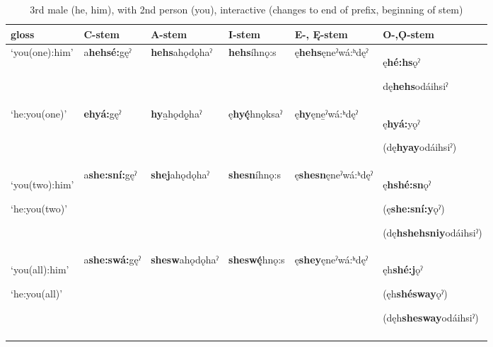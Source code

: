 \begin{table}
\caption{3rd male (he, him), with 2nd person (you), interactive (changes to end of prefix, beginning of stem)}
\label{tab:1:3m2pron2}
\tiny{
\begin{tabularx}{\textwidth}{XXXXXX}
\lsptoprule
gloss & C-stem & A-stem & I-stem & E-, Ę{}-stem & O-,Ǫ{}-stem\\
\midrule
‘you(one):him’ & a\textbf{hehsé:}gęˀ & \textbf{hehs}ahǫdǫhaˀ & \textbf{hehs}íhnǫ:s & ę\textbf{hehs}ęneˀwá:ʰdęˀ & ę\textbf{hé:hs}ǫˀ

dę\textbf{hehs}odáihsiˀ\\
‘he:you(one)’ & \textbf{ehyá:}gęˀ & \textbf{hy}a̱hǫdǫ̱haˀ & ę\textbf{hy\'{ę}}hnǫksaˀ & ę\textbf{hy}ęne̱ˀwá:ʰdęˀ & ę\textbf{hyá:}yǫˀ

(dę\textbf{hyay}odáihsiˀ)\\
‘you(two):him’

‘he:you(two)’ & a\textbf{she:sní:}gęˀ & \textbf{shej}ahǫdǫhaˀ & \textbf{shesn}íhnǫ:s & ę\textbf{shesn}ęneˀwá:ʰdęˀ & ę\textbf{hshé:sn}ǫˀ 

(ę\textbf{she:sní:y}ǫˀ)

(dę\textbf{hshehsniy}odáihsiˀ)\\
‘you(all):him’

‘he:you(all)’ & a\textbf{she:swá:}gęˀ & \textbf{shesw}ahǫdǫhaˀ & \textbf{shesw\'{ę}}hnǫ:s & ę\textbf{shey}ęneˀwá:ʰdęˀ & ęh\textbf{shé:j}ǫˀ 

(ęh\textbf{shésway}ǫˀ)

(dęh\textbf{shesway}odáihsiˀ)\\
\lspbottomrule
\end{tabularx}}
\end{table}


\lipsum[1-1]

